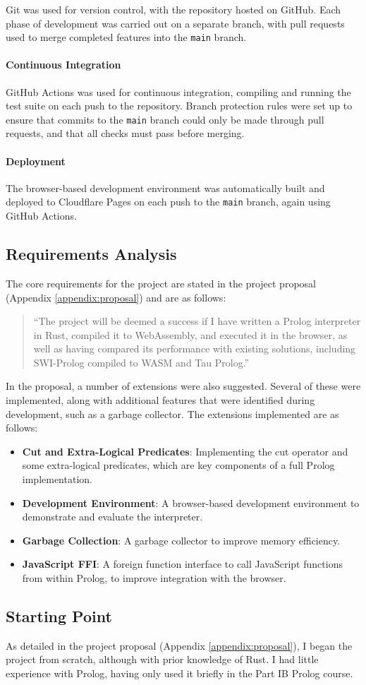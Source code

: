 Git was used for version control, with the repository hosted on GitHub. Each phase of development was carried out on a separate branch, with pull requests used to merge completed features into the \texttt{main} branch.

\paragraph{Continuous Integration} GitHub Actions was used for continuous integration, compiling and running the test suite on each push to the repository. Branch protection rules were set up to ensure that commits to the \texttt{main} branch could only be made through pull requests, and that all checks must pass before merging.

\paragraph{Deployment} The browser-based development environment was automatically built and deployed to Cloudflare Pages on each push to the \texttt{main} branch, again using GitHub Actions.

\subsection{Requirements Analysis}

The core requirements for the project are stated in the project proposal (Appendix \ref{appendix:proposal}) and are as follows:

\begin{quote}
``The project will be deemed a success if I have written a Prolog interpreter in Rust, compiled it to WebAssembly, and executed it in the browser, as well as having compared its performance with existing solutions, including SWI-Prolog compiled to WASM and Tau Prolog.''
\end{quote}

In the proposal, a number of extensions were also suggested. Several of these were implemented, along with additional features that were identified during development, such as a garbage collector. The extensions implemented are as follows:

\begin{itemize}
\item \textbf{Cut and Extra-Logical Predicates}: Implementing the cut operator and some extra-logical predicates, which are key components of a full Prolog implementation.
\item \textbf{Development Environment}: A browser-based development environment to demonstrate and evaluate the interpreter.
\item \textbf{Garbage Collection}: A garbage collector to improve memory efficiency.
\item \textbf{JavaScript FFI}: A foreign function interface to call JavaScript functions from within Prolog, to improve integration with the browser.
\end{itemize}

\subsection{Starting Point}

As detailed in the project proposal (Appendix \ref{appendix:proposal}), I began the project from scratch, although with prior knowledge of Rust. I had little experience with Prolog, having only used it briefly in the Part IB Prolog course.